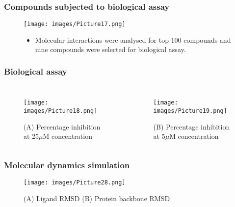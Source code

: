 \documentclass{beamer}
\begin{document}
\begin{frame}
\frametitle{\textbf{Compounds subjected to biological assay}}
\begin{figure}
\texttt{[image: images/Picture17.png]}
\begin{itemize}
\item Molecular interactions were analysed for top 100 compounds and nine compounds were selected for biological assay.
\end{itemize}
\end{figure}
\end{frame}

\begin{frame}
\frametitle{\textbf{Biological assay}}
\begin{columns}[c] 
\begin{figure}
\texttt{[image: images/Picture18.png]}
\caption{\tiny(A) Percentage inhibition at 25$\mu$M concentration}
\end{figure}
\begin{figure}
\texttt{[image: images/Picture19.png]}
\caption{\tiny(B) Percentage inhibition at 5$\mu$M concentration}
\end{figure}
\end{columns}
\end{frame}

\begin{frame}
\frametitle{\textbf{Molecular dynamics simulation}}
\begin{figure}
\texttt{[image: images/Picture28.png]}
\caption{(A) Ligand RMSD (B) Protein backbone RMSD}
\end{figure}
\end{frame}
\end{document}
